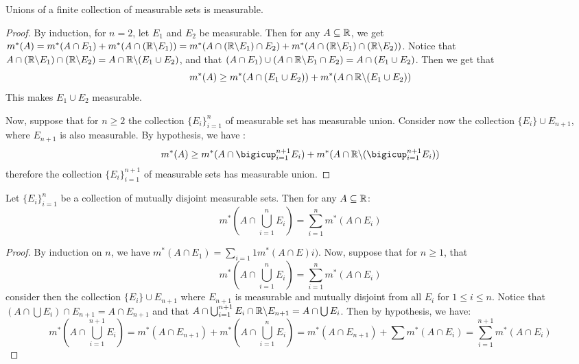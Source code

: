 \begin{lemma}\label{8.2.3}
    Unions of a finite collection of measurable sets is measurable.
\end{lemma}
\begin{proof}
    By induction, for $n=2$, let  $E_1$ and $E_2$ be measurable. Then for any $A
    \subseteq \mathbb{R}$, we get  $m^*(A)=m^*(A \cap E_1)+m^*(A \cap (\mathbb{R} \backslash E_1))=
    m^*(A \cap (\mathbb{R} \backslash E_1) \cap E_2)+m^*(A \cap (\mathbb{R} \backslash E_1) \cap
    (\mathbb{R} \backslash E_2))$. Notice that $A \cap (\mathbb{R} \backslash E_1) \cap
    (\mathbb{R} \backslash E_2)=A \cap {\mathbb{R}} \backslash (E_1 \cup E_2)$, and that $(A \cap E_1)
    \cup (A \cap \mathbb{R} \backslash E_1 \cap E_2)=A \cap (E_1 \cup E_2)$. Then we get
    that
    \begin{equation*}
        m^*(A) \geq m^*(A \cap (E_1 \cup E_2))+m^*(A \cap \mathbb{R} \backslash (E_1 \cup E_2))
    \end{equation*}
    This makes $E_1 \cup E_2$ measurable.

    Now, suppose that for $n \geq 2$ the collection $\{E_i\}_{i=1}^n$ of
    measurable set has measurable union. Consider now the collection $\{E_i\}
    \cup E_{n+1}$, where $E_{n+1}$ is also measurable. By hypothesis, we have :
    \begin{equation*}
        m^*(A) \geq m^*(A \cap \bigicup_{i=1}^{n+1}{E_i}) + m^*(A \cap
        \com{\R}{(\bigicup_{i=1}^{n+1}{E_i})})
    \end{equation*}
    therefore the collection $\{E_i\}_{i=1}^{n+1}$ of measurable sets has
    measurable union.
\end{proof}

\begin{lemma}\label{8.2.4}
    Let $\{E_i\}_{i=1}^{n}$ be a collection of mutually disjoint measurable
    sets. Then for any $A \subseteq \mathbb{R}$:
    \begin{equation*}
        m^*(A \cap \bigcup_{i=1}^n{E_i})=\sum_{i=1}^n{m^*(A \cap E_i)}
    \end{equation*}
\end{lemma}
\begin{proof}
    By induction on $n$, we have  $m^*(A \cap E_1)=\sum_{i=1}{1}{m^*(A \cap
    E)i)}$. Now, suppose that for $n \geq 1$, that
    \begin{equation*}
        m^*(A \cap \bigcup_{i=1}^n{E_i})=\sum_{i=1}^n{m^*(A \cap E_i)}
    \end{equation*}
    consider then the collection $\{E_i\} \cup E_{n+1}$ where $E_{n+1}$ is
    measurable and mutually disjoint from all $E_i$ for  $1 \leq i \leq n$.
    Notice that $(A \cap \bigcup{E_i}) \cap E_{n+1}=A \cap E_{n+1}$ and that $A
    \cap \bigcup_{i=1}^{n+1}{E_i} \cap \mathbb{R} \backslash E_{n+1}=A \cap \bigcup{E_i}$.
    Then by hypothesis, we have:
    \begin{equation*}
        m^*(A \cap \bigcup_{i=1}^{n+1}{E_i})=m^*(A \cap E_{n+1})+m^*(A \cap
    \bigcup_{i=1}^n{E_i})=m^*(A \cap E_{n+1})+\sum{m^*(A \cap
    E_i)}=\sum_{i=1}^{n+1}{m^*(A \cap E_i)}
    \end{equation*}
\end{proof}

